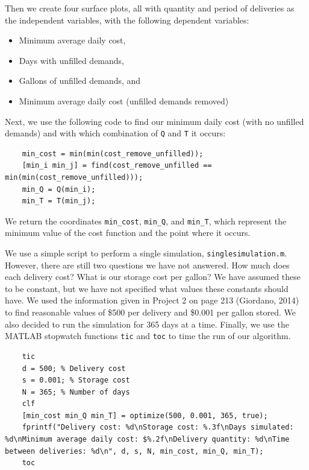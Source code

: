 \documentclass{article}
\begin{document}
    Then we create four surface plots, all with quantity and period of deliveries as the independent variables, with the following dependent variables:
    \begin{itemize}
        \item Minimum average daily cost,
        \item Days with unfilled demands,
        \item Gallons of unfilled demands, and
        \item Minimum average daily cost (unfilled demands removed)
    \end{itemize}

    Next, we use the following code to find our minimum daily cost (with no unfilled demands) and with which combination of \texttt{Q} and \texttt{T} it occurs:

    \begin{verbatim}
    min_cost = min(min(cost_remove_unfilled));
    [min_i min_j] = find(cost_remove_unfilled == min(min(cost_remove_unfilled)));
    min_Q = Q(min_i);
    min_T = T(min_j);
    \end{verbatim}

    We return the coordinates \texttt{min\_cost}, \texttt{min\_Q}, and \texttt{min\_T}, which represent the minimum value of the cost function and the point where it occurs.

    We use a simple script to perform a single simulation, \texttt{singlesimulation.m}. However, there are still two questions we have not answered. How much does each delivery cost? What is our storage cost per gallon? We have assumed these to be constant, but we have not specified what values these constants should have. We used the information given in Project 2 on page 213 (Giordano, 2014) to find reasonable values of \$500 per delivery and \$0.001 per gallon stored. We also decided to run the simulation for 365 days at a time. Finally, we use the MATLAB stopwatch functions \texttt{tic} and \texttt{toc} to time the run of our algorithm.

    \begin{verbatim}
    tic
    d = 500; % Delivery cost
    s = 0.001; % Storage cost
    N = 365; % Number of days
    clf
    [min_cost min_Q min_T] = optimize(500, 0.001, 365, true);
    fprintf("Delivery cost: %d\nStorage cost: %.3f\nDays simulated: %d\nMinimum average daily cost: $%.2f\nDelivery quantity: %d\nTime between deliveries: %d\n", d, s, N, min_cost, min_Q, min_T);
    toc
    \end{verbatim}
\end{document}
